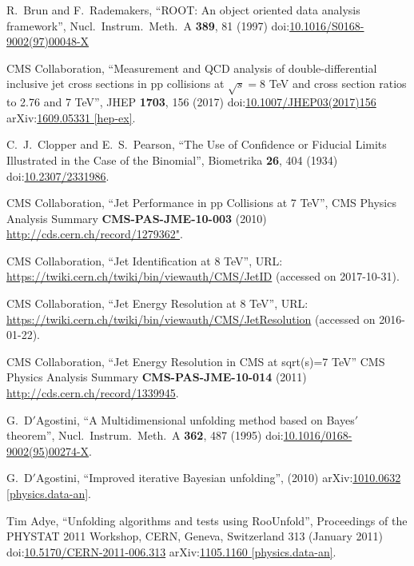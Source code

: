 \begin{thebibliography}{99}
R.~Brun and F.~Rademakers, ``ROOT: An object oriented data analysis framework'', Nucl.\ Instrum.\ Meth.\ A {\bf 389}, 81 (1997) doi:\href{http://dx.doi.org/10.1016/S0168-9002(97)00048-X}{10.1016/S0168-9002(97)00048-X}



CMS Collaboration, ``Measurement and QCD analysis of double-differential inclusive jet cross sections in pp collisions at $ \sqrt{s}=8 $ TeV and cross section ratios to 2.76 and 7 TeV'', JHEP {\bf 1703}, 156 (2017) doi:\href{http://dx.doi.org/10.1007/JHEP03(2017)156}{10.1007/JHEP03(2017)156} arXiv:\href{https://arxiv.org/abs/1609.05331}{1609.05331 [hep-ex]}.

C.~J.~Clopper and E.~S.~Pearson, ``The Use of Confidence or Fiducial Limits Illustrated in the Case of the Binomial'', Biometrika {\bf 26}, 404 (1934) doi:\href{http://www.jstor.org/stable/2331986}{10.2307/2331986}.

CMS Collaboration, ``Jet Performance in pp Collisions at 7 TeV'', CMS Physics Analysis Summary {\bf CMS-PAS-JME-10-003} (2010) \url{http://cds.cern.ch/record/1279362"}.

CMS Collaboration, ``Jet Identification at 8 TeV'', URL: \url{https://twiki.cern.ch/twiki/bin/viewauth/CMS/JetID} (accessed on 2017-10-31).

CMS Collaboration, ``Jet Energy Resolution at 8 TeV'', URL: \url{https://twiki.cern.ch/twiki/bin/viewauth/CMS/JetResolution} (accessed on 2016-01-22).

CMS Collaboration, ``Jet Energy Resolution in CMS at sqrt(s)=7 TeV'' CMS Physics Analysis Summary {\bf CMS-PAS-JME-10-014} (2011) \url {http://cds.cern.ch/record/1339945}.

G.~D$'$Agostini, ``A Multidimensional unfolding method based on Bayes$'$ theorem'', Nucl.\ Instrum.\ Meth.\ A {\bf 362}, 487 (1995) doi:\href{http://dx.doi.org/10.1016/0168-9002(95)00274-X}{10.1016/0168-9002(95)00274-X}.

G.~D$'$Agostini, ``Improved iterative Bayesian unfolding'', (2010) arXiv:\href{https://arxiv.org/abs/1010.0632}{1010.0632 [physics.data-an]}.

Tim Adye, ``Unfolding algorithms and tests using RooUnfold'', Proceedings of the PHYSTAT 2011 Workshop, CERN, Geneva, Switzerland 313 (January 2011) doi:\href{http://dx.doi.org/10.5170/CERN-2011-006.313}{10.5170/CERN-2011-006.313} arXiv:\href{https://arxiv.org/abs/1105.1160}{1105.1160 [physics.data-an]}.


\end{thebibliography}
